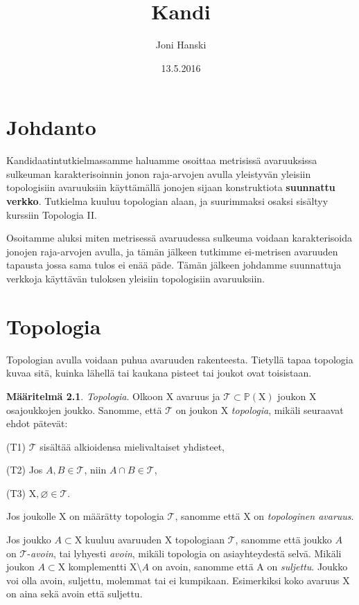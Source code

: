 \documentclass[12pt,a4paper,leqno]{report}
\title{Kandi}
\author{Joni Hanski}
\date{13.5.2016}
\newcommand{\X}{\mathrm{X}}
\newcommand{\Pow}{\mathbb{P}}
\newcommand{\T}{\mathcal{T}}
\theoremstyle{plain}
\theoremstyle{definition}
\newtheorem{maar}[equation]{Määritelmä}
\theoremstyle{remark}
\begin{document}
\maketitle

\tableofcontents

\chapter{Johdanto}\label{johd}

Kandidaatintutkielmassamme haluamme osoittaa metrisissä avaruuksissa sulkeuman karakterisoinnin jonon raja-arvojen avulla yleistyvän yleisiin topologisiin avaruuksiin käyttämällä jonojen sijaan konstruktiota \textbf{suunnattu verkko}. Tutkielma kuuluu topologian alaan, ja suurimmaksi osaksi sisältyy kurssiin Topologia II.

Osoitamme aluksi miten metrisessä avaruudessa sulkeuma voidaan karakterisoida jonojen raja-arvojen avulla, ja tämän jälkeen tutkimme ei-metrisen avaruuden tapausta jossa sama tulos ei enää päde. Tämän jälkeen johdamme suunnattuja verkkoja käyttävän tuloksen yleisiin topologisiin avaruuksiin.

\chapter{Topologia}\label{TOP}

Topologian avulla voidaan puhua avaruuden rakenteesta. Tietyllä tapaa topologia kuvaa sitä, kuinka lähellä tai kaukana pisteet tai joukot ovat toisistaan.

\begin{maar}\label{topmaar}
\emph{Topologia}. Olkoon $\X$ avaruus ja $\T \subset \Pow(\X)$ joukon $\X$ osajoukkojen joukko. Sanomme, että $\T$ on joukon $\X$ \emph{topologia}, mikäli seuraavat ehdot pätevät:

(T1) $\T$ sisältää alkioidensa mielivaltaiset yhdisteet,

(T2) Jos $A,B \in \T$, niin $A \cap B \in \T$,

(T3) $\X, \varnothing \in \T$.
\end{maar}

Jos joukolle $\X$ on määrätty topologia $\T$, sanomme että $\X$ on \emph{topologinen avaruus}.

Jos joukko $A \subset \X$ kuuluu avaruuden $\X$ topologiaan $\T$, sanomme että joukko $A$ on $\T$-\emph{avoin}, tai lyhyesti \emph{avoin}, mikäli topologia on asiayhteydestä selvä. Mikäli joukon $A \subset \X$ komplementti $\X \setminus A$ on avoin, sanomme että A on \emph{suljettu}. Joukko voi olla avoin, suljettu, molemmat tai ei kumpikaan. Esimerkiksi koko avaruus $\X$ on aina sekä avoin että suljettu.
\end{document}

